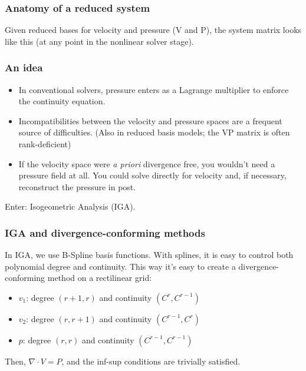 \documentclass{beamer}
\begin{document}
\begin{frame}
  \frametitle{Anatomy of a reduced system}

  Given reduced bases for velocity and pressure (V and P), the system matrix looks like this
  (at any point in the nonlinear solver stage).

  \begin{center}
  \end{center}
\end{frame}

\begin{frame}
  \frametitle{An idea}

  \begin{itemize}
  \item In conventional solvers, pressure enters as a Lagrange multiplier to enforce the continuity
    equation.
  \item Incompatibilities between the velocity and pressure spaces are a frequent source of
    difficulties. (Also in reduced basis models; the VP matrix is often rank-deficient)
  \item If the velocity space were \emph{a priori} divergence free, you wouldn't need a pressure
    field at all. You could solve directly for velocity and, if necessary, reconstruct the pressure
    in post.
  \end{itemize}

  Enter: Isogeometric Analysis (IGA).
\end{frame}

\begin{frame}
  \frametitle{IGA and divergence-conforming methods}

  In IGA, we use B-Spline basis functions. With splines, it is easy to control both polynomial
  degree and continuity. This way it's easy to create a divergence-conforming method on a
  rectilinear grid:

  \begin{itemize}
  \item $v_1$: degree $(r+1,r)$ and continuity $(C^r, C^{r-1})$
  \item $v_2$: degree $(r,r+1)$ and continuity $(C^{r-1}, C^r)$
  \item $p$: degree $(r,r)$ and continuity $(C^{r-1}, C^{r-1})$
  \end{itemize}

  Then, $\nabla \cdot V = P$, and the inf-sup conditions are trivially satisfied.
\end{frame}
\end{document}
